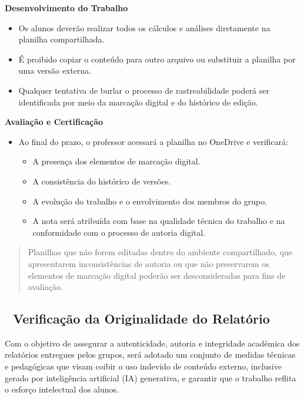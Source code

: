 \documentclass[
  a4paper,
]{book}
\providecommand{\tightlist}{%
  \setlength{\itemsep}{0pt}\setlength{\parskip}{0pt}}\usepackage{longtable,booktabs,array}
\begin{document}
\textbf{Desenvolvimento do Trabalho}

\begin{itemize}
\item
  Os alunos deverão realizar todos os cálculos e análises diretamente na
  planilha compartilhada.
\item
  É proibido copiar o conteúdo para outro arquivo ou substituir a
  planilha por uma versão externa.
\item
  Qualquer tentativa de burlar o processo de rastreabilidade poderá ser
  identificada por meio da marcação digital e do histórico de edição.
\end{itemize}

\textbf{Avaliação e Certificação}

\begin{itemize}
\item
  Ao final do prazo, o professor acessará a planilha no OneDrive e
  verificará:

  \begin{itemize}
  \tightlist
  \item
    A presença dos elementos de marcação digital.
  \item
    A consistência do histórico de versões.
  \item
    A evolução do trabalho e o envolvimento dos membros do grupo.
  \item
    A nota será atribuída com base na qualidade técnica do trabalho e na
    conformidade com o processo de autoria digital.
  \end{itemize}
\end{itemize}

\begin{quote}
Planilhas que não forem editadas dentro do ambiente compartilhado, que
apresentarem inconsistências de autoria ou que não preservarem os
elementos de marcação digital poderão ser desconsideradas para fins de
avaliação.
\end{quote}

\subsection{📝 Verificação da Originalidade do
Relatório}\label{verificauxe7uxe3o-da-originalidade-do-relatuxf3rio}

Com o objetivo de assegurar a autenticidade, autoria e integridade
acadêmica dos relatórios entregues pelos grupos, será adotado um
conjunto de medidas técnicas e pedagógicas que visam coibir o uso
indevido de conteúdo externo, inclusive gerado por inteligência
artificial (IA) generativa, e garantir que o trabalho reflita o esforço
intelectual dos alunos.
\end{document}
